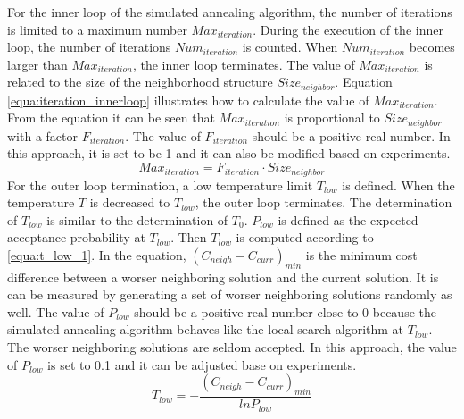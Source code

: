 	For the inner loop of the simulated annealing algorithm, the
	number of iterations is limited to a maximum number $Max_{iteration}$. During the
	execution of the inner loop, the number of iterations $Num_{iteration}$ is counted.
	When $Num_{iteration}$ becomes larger than $Max_{iteration}$, the inner
	loop terminates. The value of $Max_{iteration}$ is related to the size of the
	neighborhood structure $Size_{neighbor}$. Equation \ref{equa:iteration_innerloop}
	illustrates how to calculate the value of $Max_{iteration}$. From the equation it
	can be seen that $Max_{iteration}$ is proportional to $Size_{neighbor}$ with a
	factor $F_{iteration}$. The value of $F_{iteration}$ should be a positive real
	number. In this approach, it is set to be 1 and it can also be modified based on
	experiments.
	\begin{equation}
	\label{equa:iteration_innerloop}
		Max_{iteration}=F_{iteration} \cdot Size_{neighbor}
	\end{equation}
	For the outer loop termination, a low temperature limit $T_{low}$ is defined. When the
	temperature $T$ is decreased to $T_{low}$, the outer loop terminates. The determination of
	$T_{low}$ is similar to the determination of $T_{0}$. $P_{low}$ is defined as the expected
	acceptance probability at $T_{low}$. Then $T_{low}$ is computed according to
	\ref{equa:t_low_1}. In the equation, $\left( C_{neigh}-C_{curr} \right)_{min}$ is the
	minimum cost difference between a worser neighboring solution and the current
	solution. It is can be measured by generating a set of worser neighboring solutions randomly
	as well. The value of $P_{low}$ should be a positive real number close to 0 because the
	simulated annealing algorithm behaves like the local search algorithm at $T_{low}$. The
	worser neighboring solutions are seldom accepted. In this approach, the value of $P_{low}$
	is set to 0.1 and it can be adjusted base on experiments.
	\begin{equation}
	\label{equa:t_low_1}
		T_{low}= - \frac{\left( C_{neigh}-C_{curr} \right)_{min}}{ln{P_{low}}}
	\end{equation}	
	
	
	
	
	
	
	